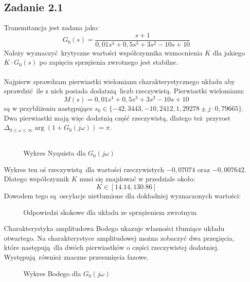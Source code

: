\documentclass[a4paper, 12pt]{article}
\begin{document}
		\subsection{Zadanie 2.1}
		Transmitancja jest zadana jako:
		$$
			G_0(s) = \frac{s + 1}{0,01s^4 + 0,5s^3 + 3 s^2 -10s + 10}
		$$ \noindent
		Należy wyznaczyć krytyczne wartości współczynnika wzmocnienia $K$ dla jakiego $K \cdot G_0(s)$ po zapięciu sprzężenia zwrotnego jest stabilne.
		\\
		\\
		Najpierw sprawdzam pierwiastki wielomianu charakterystycznego układu aby sprawdzić ile z nich posiada dodatnią liczb rzeczywistą. Pierwiastki wielomianu: 
		$$
			M(s) = 0,01s^4 + 0,5s^3 + 3 s^2 -10s + 10
		$$
		są w przybliżeniu następujące $s_0 \in \{-42,3443, -10,2412, 1,29278 \pm j\cdot 0,79665\}$. Dwa \linebreak pierwiastki mają więc dodatnią część rzeczywistą, dlatego też przyrost \linebreak $\Delta_{0 \leq \omega \leq \infty} \arg(1 + G_0(j\omega)) = \pi$. \\ \\
		\begin{figure}[H]
			\centering
			\def \svgwidth{0.7\columnwidth}
			
			\caption{Wykres Nyquista dla $G_0(j\omega)$}
		\end{figure}\noindent
		Wykres ten oś rzeczywistą dla wartości rzeczywistych $-0,07074$ oraz $-0,007642$. Dlatego współczynnik $K$ musi się znajdować w przedziale około:
		$$
			K \in [14.14, 130.86]
		$$
		Dowodem tego są oscylacje nietłumione dla dokładniej wyznaczonych wartości:
		\begin{figure}[H]
			\centering
			\def \svgwidth{0.49\columnwidth}
			
			\def \svgwidth{0.49\columnwidth}
			
			\caption{Odpowiedzi skokowe dla układu ze sprzężeniem zwrotnym}
		\end{figure}\noindent
		Charakterystyka amplitudowa Bodego ukazuje własności tłumiące układu otwartego. Na charakterystyce amplitudowej można zobaczyć dwa przegięcia, które następują dla dwóch pierwiastków o części rzeczywistej dodatniej. Występują również znaczne przesunięcia fazowe.
		\begin{figure}[H]
			\centering
			\def \svgwidth{0.7\columnwidth}
			
			\caption{Wykres Bodego dla $G_0(j\omega)$}
		\end{figure}\noindent
\end{document}
